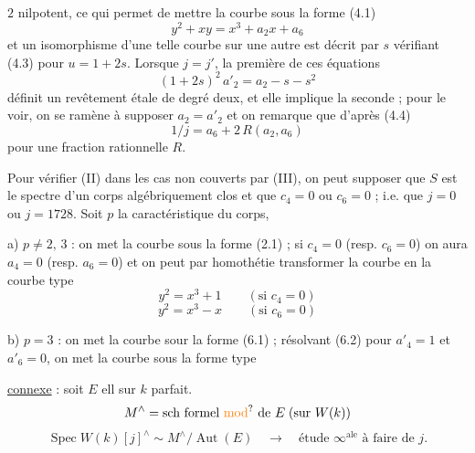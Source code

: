 \makeatletter\tagsleft@true\makeatother

$2$ nilpotent, ce qui permet de mettre la courbe sous la forme (4.1)
\[
y^2+xy=x^3+a_2x+a_6
\]
et un isomorphisme d'une telle courbe sur une autre est décrit par $s$ vérifiant (4.3) pour $u=1+2s$. Lorsque $j=j'$, la première de ces équations
\[
(1+2s)^2\,a'_2=a_2-s-s^2
\]
définit un revêtement étale de degré deux, et elle implique la seconde ; pour le voir, on se ramène à supposer $a_2=a'_2$ et on remarque que d'après (4.4)
\[
1/j=a_6+2\,R(a_2,a_6)
\]
pour une fraction rationnelle $R$.

Pour vérifier (II) dans les cas non couverts par (III), on peut supposer que $S$ est le spectre d'un corps algébriquement clos et que $c_4=0$ ou $c_6=0$ ; i.e. que $j=0$ ou $j=1728$. Soit $p$ la caractéristique du corps,

a) $p\ne 2,\,3$ : on met la courbe sous la forme (2.1) ; si $c_4=0$ (resp. $c_6=0$) on aura $a_4=0$ (resp. $a_6=0$) et on peut par homothétie transformer la courbe en la courbe type
\[
y^2=x^3+1\qquad(\text{si }c_4=0)\tag*{(6.5)}
\]
\[
y^2=x^3-x\qquad(\text{si }c_6=0)\tag*{(6.6)}
\]

b) $p=3$ : on met la courbe sour la forme (6.1) ; résolvant (6.2) pour $a'_4=1$ et $a'_6=0$, on met la courbe sous la forme type


\uline{ connexe} : soit $E$ ell sur $k$ parfait.
\[
M^{\wedge}=\text{sch formel \unsure{mod} de }E\;(\text{sur }W(k))
\]
\[
\boxed{\operatorname{Spec} W(k)[j]^{\wedge}\sim M^{\wedge}/\operatorname{Aut}(E)}
\quad\longrightarrow\quad\text{étude }\infty^{\mathrm{ale}}\text{ à faire de }j.
\]


